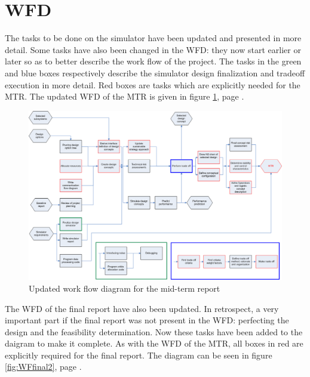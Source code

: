 \section{\acl{WFD}}
\label{WFD}
The tasks to be done on the simulator have been updated and presented in more detail. Some tasks have also been 
changed in the \ac{WFD}: they now start earlier or later so as to better describe the work flow of the project. 
The tasks in the green and blue boxes respectively describe the simulator design finalization and tradeoff execution in more detail. Red boxes are tasks which are explicitly needed for the \ac{MTR}. The updated \ac{WFD} of the \ac{MTR} is given in figure \ref{fig:WFmidterm2}, page \pageref{fig:WFmidterm2}.

\begin{figure}
\centering
\includegraphics[width=\textheight, angle=90]{chapters/img/Workflow_diagram_MTR_v2.png}
\caption{Updated work flow diagram for the mid-term report}
\label{fig:WFmidterm2}
\end{figure}

The \ac{WFD} of the final report have also been updated. In retrospect, a very important part if the final report was not 
present in the \ac{WFD}: perfecting the design and the feasibility determination. Now these tasks have been added
to the daigram to make it complete. As with the \ac{WFD} of the \ac{MTR}, all boxes in red are explicitly required
for the final report. The diagram can be seen in figure \ref{fig:WFfinal2}, page \pageref{fig:WFfinal2}.

